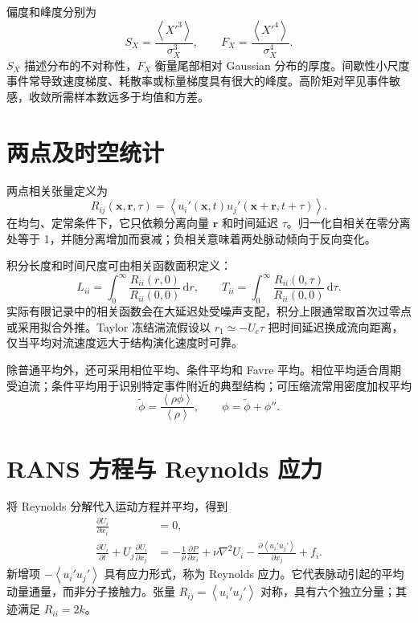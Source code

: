 \documentclass[12pt,a4paper,openany,fontset=none]{ctexbook}
\newcommand{\dd}{\,\mathrm d}
\newcommand{\avg}[1]{\left\langle #1\right\rangle}
\begin{document}
偏度和峰度分别为
\begin{equation}
 S_X=\frac{\avg{X'^3}}{\sigma_X^3},\qquad
 F_X=\frac{\avg{X'^4}}{\sigma_X^4}.
\end{equation}
$S_X$ 描述分布的不对称性，$F_X$ 衡量尾部相对 Gaussian 分布的厚度。间歇性小尺度事件常导致速度梯度、耗散率或标量梯度具有很大的峰度。高阶矩对罕见事件敏感，收敛所需样本数远多于均值和方差。

\section{两点及时空统计}

两点相关张量定义为
\begin{equation}
 R_{ij}(\bm x,\bm r,\tau)=
 \avg{u_i'(\bm x,t)u_j'(\bm x+\bm r,t+\tau)}.
\end{equation}
在均匀、定常条件下，它只依赖分离向量 $\bm r$ 和时间延迟 $\tau$。归一化自相关在零分离处等于 1，并随分离增加而衰减；负相关意味着两处脉动倾向于反向变化。

积分长度和时间尺度可由相关函数面积定义：
\begin{equation}
 L_{ii}=\int_0^\infty \frac{R_{ii}(r,0)}{R_{ii}(0,0)}\dd r,
 \qquad
 T_{ii}=\int_0^\infty \frac{R_{ii}(0,\tau)}{R_{ii}(0,0)}\dd\tau.
\end{equation}
实际有限记录中的相关函数会在大延迟处受噪声支配，积分上限通常取首次过零点或采用拟合外推。Taylor 冻结湍流假设以 $r_1\simeq-U_c\tau$ 把时间延迟换成流向距离，仅当平均对流速度远大于结构演化速度时可靠。

除普通平均外，还可采用相位平均、条件平均和 Favre 平均。相位平均适合周期受迫流；条件平均用于识别特定事件附近的典型结构；可压缩流常用密度加权平均
\begin{equation}
 \widetilde{\phi}=\frac{\avg{\rho\phi}}{\avg\rho},\qquad \phi=\widetilde\phi+\phi''.
\end{equation}

\section{RANS 方程与 Reynolds 应力}

将 Reynolds 分解代入运动方程并平均，得到
\begin{align}
 \frac{\partial U_i}{\partial x_i}&=0,\\
 \frac{\partial U_i}{\partial t}+U_j\frac{\partial U_i}{\partial x_j}
 &=-\frac{1}{\rho}\frac{\partial P}{\partial x_i}
 +\nu\nabla^2U_i-\frac{\partial\avg{u_i'u_j'}}{\partial x_j}+f_i.
\end{align}
新增项 $-\avg{u_i'u_j'}$ 具有应力形式，称为 Reynolds 应力。它代表脉动引起的平均动量通量，而非分子接触力。张量 $R_{ij}=\avg{u_i'u_j'}$ 对称，具有六个独立分量；其迹满足 $R_{ii}=2k$。
\end{document}
